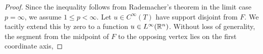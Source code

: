 \documentclass[10pt,a4paper]{article}
\begin{document}
\begin{proof}
\begin{comment}
    There exists $w \in W^{1,p}(T)$ with $\nabla w = \nabla u$ and 
    \begin{gather*}
        \| w \|_{L^{p}(T)}
        \leq 
        C_{\PF,T,p} 
        \| \nabla w \|_{L^{p}(T)} %
        .
    \end{gather*}
    Then $w-u$ is constant, and thus $\gamma := \trace_{F} (w-u) = \trace_{F} w$. 
    We use that 
    \begin{gather*}
        \| \gamma \|_{L^{p}(T)}
        =
        \gamma \vol(T)^\frac{1}{p}
        =
        \left( \frac{ \vol(T) }{ \vol(F) } \right)^\frac{1}{p}
        \cdot 
        \gamma 
        \vol(F)^\frac{1}{p}
        =
        \left( \frac{ \vol(T) }{ \vol(F) } \right)^\frac{1}{p}
        \| \gamma \|_{L^{p}(F)}
        .
    \end{gather*}
    Using a trace inequality~\cite[Lemma~2.8]{veeser2012poincare} when $1 \leq p < \infty$, we find 
    \begin{align*}
        \| \gamma \|_{L^{p}(F)}^{p}
        &
        \leq 
        \frac{ \vol(F) }{ \vol(T) }
        \| w \|_{L^{p}(T)}^{p}
        +
        p
        \cdot 
        \diam(T)
        \frac{ \vol(F) }{ \vol(T) }
        \| w \|_{L^{p}(T)}^{p-1}
        \| \nabla w \|_{L^{p}(T)}
        \\&
        \leq 
        \left( \frac{ \vol(F) }{ \vol(T) } \right)
        \left( C_{\PF,T,p}^{p} + p \cdot C_{\PF,T,p}^{p-1} \right) 
        \diam(T)^{p}
        \| \nabla w \|_{L^{p}(T)}^{p}
        \\&
        \leq 
        \left( \frac{ \vol(F) }{ \vol(T) } \right)
        \left( C_{\PF,T,p}^{p} + p \cdot \diam(T) C_{\PF,T,p}^{p-1} \right) 
        \| \nabla w \|_{L^{p}(T)}^{p}
        .
    \end{align*}
    Recall that $u = w - \gamma$. The first inequality follows. 
\end{comment}
    Since the inequality follows from Rademacher's theorem in the limit case $p = \infty$,
    we assume $1 \leq p < \infty$. 
    Let $u \in C^{\infty}(T)$ have support disjoint from $F$.
    We tacitly extend this by zero to a function $u \in L^{\infty}({\mathbb R}^{n})$. 
    Without loss of generality, 
    the segment from the midpoint of $F$ to the opposing vertex lies on the first coordinate axis,

\end{proof}
\end{document}
